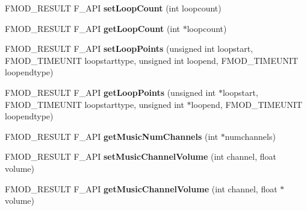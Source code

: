 \begin{DoxyCompactItemize}
\item 
\hypertarget{class_f_m_o_d_1_1_sound_af5da99ae0aff53b50910a36e3510d7ba}{F\+M\+O\+D\+\_\+\+R\+E\+S\+U\+L\+T F\+\_\+\+A\+P\+I {\bfseries set\+Loop\+Count} (int loopcount)}\label{class_f_m_o_d_1_1_sound_af5da99ae0aff53b50910a36e3510d7ba}

\item 
\hypertarget{class_f_m_o_d_1_1_sound_a8ed3b79d45f937d215a84e52c2be4891}{F\+M\+O\+D\+\_\+\+R\+E\+S\+U\+L\+T F\+\_\+\+A\+P\+I {\bfseries get\+Loop\+Count} (int $\ast$loopcount)}\label{class_f_m_o_d_1_1_sound_a8ed3b79d45f937d215a84e52c2be4891}

\item 
\hypertarget{class_f_m_o_d_1_1_sound_ae4ed822496a4bd387e8384aec67e33f9}{F\+M\+O\+D\+\_\+\+R\+E\+S\+U\+L\+T F\+\_\+\+A\+P\+I {\bfseries set\+Loop\+Points} (unsigned int loopstart, F\+M\+O\+D\+\_\+\+T\+I\+M\+E\+U\+N\+I\+T loopstarttype, unsigned int loopend, F\+M\+O\+D\+\_\+\+T\+I\+M\+E\+U\+N\+I\+T loopendtype)}\label{class_f_m_o_d_1_1_sound_ae4ed822496a4bd387e8384aec67e33f9}

\item 
\hypertarget{class_f_m_o_d_1_1_sound_a6528c2344a8f4b87c1f48bc02a829fc5}{F\+M\+O\+D\+\_\+\+R\+E\+S\+U\+L\+T F\+\_\+\+A\+P\+I {\bfseries get\+Loop\+Points} (unsigned int $\ast$loopstart, F\+M\+O\+D\+\_\+\+T\+I\+M\+E\+U\+N\+I\+T loopstarttype, unsigned int $\ast$loopend, F\+M\+O\+D\+\_\+\+T\+I\+M\+E\+U\+N\+I\+T loopendtype)}\label{class_f_m_o_d_1_1_sound_a6528c2344a8f4b87c1f48bc02a829fc5}

\item 
\hypertarget{class_f_m_o_d_1_1_sound_ae5af50e5bdaec640dceb9a797c75fa99}{F\+M\+O\+D\+\_\+\+R\+E\+S\+U\+L\+T F\+\_\+\+A\+P\+I {\bfseries get\+Music\+Num\+Channels} (int $\ast$numchannels)}\label{class_f_m_o_d_1_1_sound_ae5af50e5bdaec640dceb9a797c75fa99}

\item 
\hypertarget{class_f_m_o_d_1_1_sound_ab5dc7c5f81b8301d9ea74bd0c0d00c49}{F\+M\+O\+D\+\_\+\+R\+E\+S\+U\+L\+T F\+\_\+\+A\+P\+I {\bfseries set\+Music\+Channel\+Volume} (int channel, float volume)}\label{class_f_m_o_d_1_1_sound_ab5dc7c5f81b8301d9ea74bd0c0d00c49}

\item 
\hypertarget{class_f_m_o_d_1_1_sound_afc1ef61ba84190294a6b1f1f0fd3ab64}{F\+M\+O\+D\+\_\+\+R\+E\+S\+U\+L\+T F\+\_\+\+A\+P\+I {\bfseries get\+Music\+Channel\+Volume} (int channel, float $\ast$volume)}\label{class_f_m_o_d_1_1_sound_afc1ef61ba84190294a6b1f1f0fd3ab64}


\end{DoxyCompactItemize}
